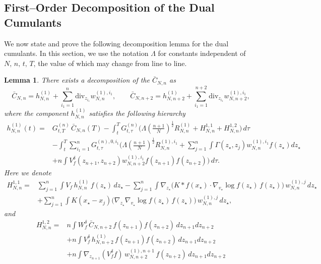 \documentclass[pdflatex,sn-mathphys-num]{sn-jnl}
\theoremstyle{thmstyleone}%
\theoremstyle{thmstyletwo}%
\theoremstyle{thmstylethree}%
\newtheorem{lemma}{Lemma}
\begin{document}
\subsection{First--Order Decomposition of the Dual Cumulants}
We now state and prove the following decomposition lemma for the dual cumulants. In this section, we use the notation $\Lambda$ for constants independent of $N,\,n,\,t,\,T$, the value of which may change from line to line.
%
\begin{lemma}\label{lem:decomposition-h1-w1}
There exists a decomposition of the \(\bar C_{N,n}\) as
\[
\bar{C}_{N,n}
= h^{(1)}_{N,n} + \sum_{i_1=1}^{n} \mathrm{div}_{z_{i_1}} w^{(1),i_1}_{N,n},
\qquad
\bar{C}_{N,n+2}
= h^{(1)}_{N,n+2} + \sum_{i_1=1}^{n+2} \mathrm{div}_{z_{i_1}} w^{(1),i_1}_{N,n+2},
\]
where the component \(h^{(1)}_{N,n}\) satisfies the following hierarchy
\[
\begin{aligned}
h^{(1)}_{N,n}(t)=&G_{t,T}^{(n)}\,\bar C_{N,n}(T)
 -\int_t^T G_{t,\tau}^{(n)} \Bigg(
\Lambda\!\left(\tfrac{n+1}{N}\right)^{\frac12} R^{(1)}_{N,n}
+H_{N,n}^{1,1}+H_{N,n}^{1,2} 
\Bigg)\,d\tau \\
&-\int_t^T \sum_{i_1=1}^n G_{t,\tau}^{(n),0,i_1} \Bigg(\Lambda\! \left( \tfrac{n+1}{N}\right)^{\frac{1}{2}}R_{N,n}^{(1),i_1} +  \sum_{j=1}^n \int \Gamma (z_\star,z_j) w^{(1),i_1}_{N,n} f(z_\star) dz_\star \\
&+ n \int V_f^{\delta} (z_{n+1}, z_{n+2}) w^{(1),i_1}_{N,n+2} f(z_{n+1}) f(z_{n+2}) \Bigg) \, d\tau.
\end{aligned}
\]
Here we denote
\[
\begin{split}
    H^{1,1}_{N,n}=&\sum_{j=1}^n \int V_f \, h^{(1)}_{N,n} \, f(z_{\star})\,dz_{\star} - \sum_{j=1}^n \int \nabla_{z_{\star}}
\Big( K \ast f(x_{\star}) \cdot \nabla_{v_{\star}} \log f(z_{\star})\, f(z_{\star}) \Big)
\, w^{(1),j}_{N,n}\,dz_{\star}\\
&+ \sum_{j=1}^n \int K(x_{\star}-x_j)
\Big(\nabla_{z_{\star}} \nabla_{v_{\star}} \log f(z_{\star})\, f(z_{\star})\Big)
\, w^{(1),j}_{N,n}\,dz_{\star}, 
\end{split}
\]
and 
\[
\begin{split}
    H^{1,2}_{N,n}=& n \!\!\int W_f^{\delta}\, \bar{C}_{N,n+2}\,
f(z_{n+1}) f(z_{n+2})\,dz_{n+1}dz_{n+2}\\
&+ n \!\!\int V_f^{\delta}\, h^{(1)}_{N,n+2}\,
f(z_{n+1}) f(z_{n+2})\,dz_{n+1}dz_{n+2} \\
&+ n \!\!\int \nabla_{z_{n+1}}(V_f^{\delta} f)\,
w_{N,n+2}^{(1),n+1}\, f(z_{n+2})\,dz_{n+1}dz_{n+2}\\

\end{split}\]
\end{lemma}
\end{document}
